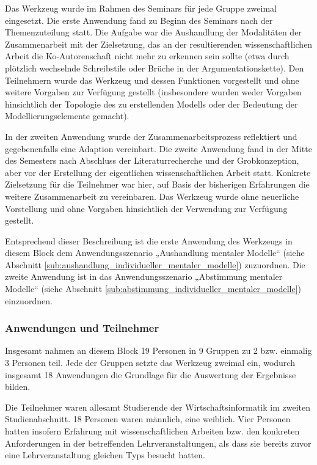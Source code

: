 Das Werkzeug wurde im Rahmen des Seminars für jede Gruppe zweimal eingesetzt. Die erste Anwendung fand zu Beginn des Seminars nach der Themenzuteilung statt. Die Aufgabe war die Aushandlung der Modalitäten der Zusammenarbeit mit der Zielsetzung, das an der resultierenden wissenschaftlichen Arbeit die Ko-Autorenschaft nicht mehr zu erkennen sein sollte (etwa durch plötzlich wechselnde Schreibstile oder Brüche in der Argumentationskette). Den Teilnehmern wurde das Werkzeug und dessen Funktionen vorgestellt und ohne weitere Vorgaben zur Verfügung gestellt (insbesondere wurden weder Vorgaben hinsichtlich der Topologie des zu erstellenden Modells oder der Bedeutung der Modellierungselemente gemacht).

In der zweiten Anwendung wurde der Zusammenarbeitsprozess reflektiert und gegebenenfalls eine Adaption vereinbart. Die zweite Anwendung fand in der Mitte des Semesters nach Abschluss der Literaturrecherche und der Grobkonzeption, aber vor der Erstellung der eigentlichen wissenschaftlichen Arbeit statt. Konkrete Zielsetzung für die Teilnehmer war hier, auf Basis der bisherigen Erfahrungen die weitere Zusammenarbeit zu vereinbaren. Das Werkzeug wurde ohne neuerliche Vorstellung und ohne Vorgaben hinsichtlich der Verwendung zur Verfügung gestellt.

Entsprechend dieser Beschreibung ist die erste Anwendung des Werkzeugs in diesem Block dem Anwendungsszenario „Aushandlung mentaler Modelle“ (siehe Abschnitt \ref{sub:aushandlung_individueller_mentaler_modelle}) zuzuordnen. Die zweite Anwendung ist in das Anwendungsszenario „Abstimmung mentaler Modelle“ (siehe Abschnitt \ref{sub:abstimmung_individueller_mentaler_modelle}) einzuordnen.

\subsubsection{Anwendungen und Teilnehmer} %
\label{ssub:2_teilnehmer}

Insgesamt nahmen an diesem Block 19 Personen in 9 Gruppen zu 2 bzw. einmalig 3 Personen teil. Jede der Gruppen setzte das Werkzeug zweimal ein, wodurch insgesamt 18 Anwendungen die Grundlage für die Auswertung der Ergebnisse bilden.

Die Teilnehmer waren allesamt Studierende der Wirtschaftsinformatik im zweiten Studienabschnitt. 18 Personen waren männlich, eine weiblich. Vier Personen hatten insofern Erfahrung mit wissenschaftlichen Arbeiten bzw. den konkreten Anforderungen in der betreffenden Lehrveranstaltungen, als dass sie bereits zuvor eine Lehrveranstaltung gleichen Typs besucht hatten.

